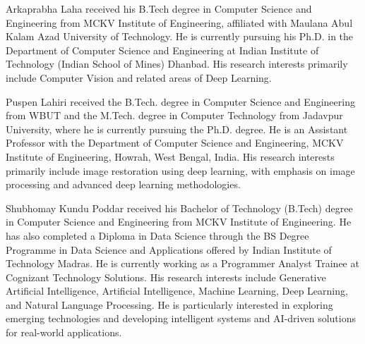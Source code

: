 \documentclass[a4paper,fleqn]{cas-dc}
\begin{document}






%
%






Arkaprabha Laha received his B.Tech degree in Computer Science and Engineering from MCKV Institute of Engineering, affiliated with Maulana Abul Kalam Azad University of Technology. He is currently pursuing his Ph.D. in the Department of Computer Science and Engineering at Indian Institute of Technology (Indian School of Mines) Dhanbad. His research interests primarily include Computer Vision and related areas of Deep Learning.
\endbio

\vspace*{-1\baselineskip}

Puspen Lahiri received the B.Tech. degree in Computer Science and Engineering from WBUT and the M.Tech. degree in Computer Technology from Jadavpur University, where he is currently pursuing the Ph.D. degree. He is an Assistant Professor with the Department of Computer Science and Engineering, MCKV Institute of Engineering, Howrah, West Bengal, India. His research interests primarily include image restoration using deep learning, with emphasis on image processing and advanced deep learning methodologies.
\endbio

\vspace*{-1\baselineskip}

Shubhomay Kundu Poddar received his Bachelor of Technology (B.Tech) degree in Computer Science and Engineering from MCKV Institute of Engineering. He has also completed a Diploma in Data Science through the BS Degree Programme in Data Science and Applications offered by Indian Institute of Technology Madras. He is currently working as a Programmer Analyst Trainee at Cognizant Technology Solutions. His research interests include Generative Artificial Intelligence, Artificial Intelligence, Machine Learning, Deep Learning, and Natural Language Processing. He is particularly interested in exploring emerging technologies and developing intelligent systems and AI-driven solutions for real-world applications.
\endbio
\end{document}

